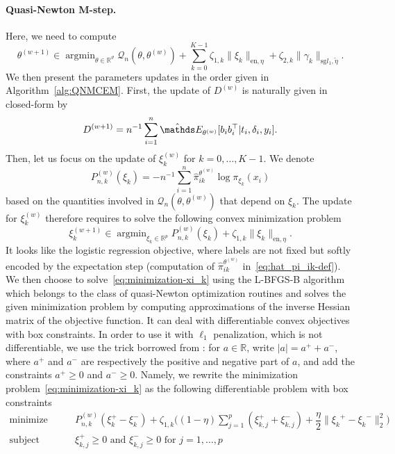 \documentclass[11pt]{article}
\DeclareMathOperator{\argmin}{argmin}
\newcommand{\norm}[1]{\|#1\|}
\newcommand{\cQ}{\mathcal Q}
\newcommand{\R}{\mathds R}
\newcommand{\E}{\mathds E}
\begin{document}
\paragraph*{Quasi-Newton M-step.}
Here, we need to compute \[\theta^{(w+1)} \in \argmin_{\theta \in \R^\vartheta} \cQ_n(\theta, \theta^{(w)}) + \sum_{k=0}^{K-1} \zeta_{1,k} \norm{\xi_k}_{\text{en}, \eta} + \zeta_{2,k} \norm{\gamma_k}_{\text{sg} l_1, \tilde{\eta}}.\]
We then present the parameters updates in the order given in Algorithm~\ref{alg:QNMCEM}.
First, the update of $D^{(w)}$ is naturally given in closed-form by
\begin{equation}
  \label{eq:update_D}
  D^{(w+1)} = n^{-1} \sum_{i=1}^n \hat \E_{\theta^{(w)}}[ b_i b_i^\top | t_i, \delta_i, y_i].
\end{equation}
Then, let us focus on the update of $\xi_k^{(w)}$ for $k=0, \ldots, K-1$. We denote
\[ P^{(w)}_{n,k}(\xi_k) = -n^{-1} \sum_{i=1}^n \hat \pi_{ik}^{\theta^{(w)}} \log \pi_{\xi_k}(x_i) \]
based on the quantities involved in $\cQ_n(\theta, \theta^{(w)})$ that depend on $\xi_k$. The update for $\xi_k^{(w)}$ therefore requires to solve the following convex minimization problem
\begin{equation}
  \label{eq:minimization-xi_k}
  \xi_k^{(w+1)} \in \argmin_{\xi_k \in \R^p} P^{(w)}_{n,k}(\xi_k) + \zeta_{1,k} \norm{\xi_k}_{\text{en}, \eta}.
\end{equation}
It looks like the logistic regression objective, where labels are not fixed but softly encoded by the expectation step (computation of $\hat \pi_{ik}^{\theta^{(w)}}$ in~\eqref{eq:hat_pi_ik-def}). We then choose to solve~\eqref{eq:minimization-xi_k} using the L-BFGS-B algorithm~\citep{zhu1997algorithm} which belongs to the class of quasi-Newton optimization routines and solves the given minimization problem by computing approximations
of the inverse Hessian matrix of the objective function. It can deal with differentiable convex objectives with box constraints.
In order to use it with $\ell_1$ penalization, which is not differentiable, we use the trick borrowed from \citet{andrew2007scalable}: for $a \in \R$, write $|a| = a^+ + a^-$, where $a^+$ and $a^-$ are respectively the positive and negative part of $a$, and add the constraints $a^+ \geq 0$ and $a^- \geq 0$.
Namely, we rewrite the minimization problem~\eqref{eq:minimization-xi_k} as the following differentiable problem with box constraints
\begin{equation}
  \label{eq:sub-problem-xi_k}
  \begin{split}
    \text{minimize}& \quad \quad P_{n, k}^{(w)}(\xi_k^+ - \xi_k^-) + \zeta_{1,k} \big((1 - \eta) \sum_{j=1}^p (\xi_{k,j}^+ + \xi_{k,j}^-) + \dfrac \eta 2 \norm{{\xi_k}^+ - {\xi_k}^-}_2^2 \big) \\
    \text{subject to}& \quad \quad \xi_{k,j}^+ \geq 0 \text{ and } \xi_{k,j}^- \geq 0 \text{ for } j = 1, \ldots, p
  \end{split} 
\end{equation}
\end{document}

